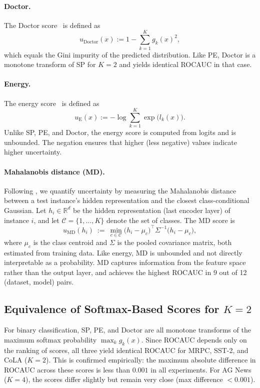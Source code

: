 \documentclass{article}
\theoremstyle{plain}
\theoremstyle{definition}
\theoremstyle{remark}
\begin{document}
\paragraph{Doctor.}
The Doctor score~\citep{granese2021doctorsimplemethoddetecting} is defined as
\[
u_{\mathrm{Doctor}}(x) := 1 - \sum_{k=1}^K g_k(x)^2,
\]
which equals the Gini impurity of the predicted distribution. Like PE, Doctor is a monotone transform of SP for $K=2$ and yields identical ROCAUC in that case.

\paragraph{Energy.}
The energy score~\citep{liu2021energybasedoutofdistributiondetection} is defined as
\[
u_{\mathrm{E}}(x) := -\log \sum_{k=1}^K \exp\bigl(l_k(x)\bigr).
\]
Unlike SP, PE, and Doctor, the energy score is computed from logits and is unbounded. The negation ensures that higher (less negative) values indicate higher uncertainty.

\paragraph{Mahalanobis distance (MD).}
Following \citet{vazhentsev_uncertainty_2022}, we quantify uncertainty by measuring the Mahalanobis distance between a test instance's hidden representation and the closest class-conditional Gaussian. Let $h_i\in\mathbb R^d$ be the hidden representation (last encoder layer) of instance $i$, and let $\mathcal C=\{1,\dots,K\}$ denote the set of classes. The MD score is
\begin{equation}
u_{\mathrm{MD}}(h_i)
~:=~
\min_{c\in\mathcal C}
\big(h_i-\mu_c\big)^\top \Sigma^{-1}\big(h_i-\mu_c\big),
\label{eq:md_score}
\end{equation}
where $\mu_c$ is the class centroid and $\Sigma$ is the pooled covariance matrix, both estimated from training data.
Like energy, MD is unbounded and not directly interpretable as a probability.
MD captures information from the feature space rather than the output layer, and achieves the highest ROCAUC in 9 out of 12 (dataset, model) pairs.

\subsection{Equivalence of Softmax-Based Scores for $K=2$}

For binary classification, SP, PE, and Doctor are all monotone transforms of the maximum softmax probability $\max_k g_k(x)$. Since ROCAUC depends only on the ranking of scores, all three yield identical ROCAUC for MRPC, SST-2, and CoLA ($K=2$). This is confirmed empirically: the maximum absolute difference in ROCAUC across these scores is less than $0.001$ in all experiments. For AG News ($K=4$), the scores differ slightly but remain very close (max difference $< 0.001$).
\end{document}

